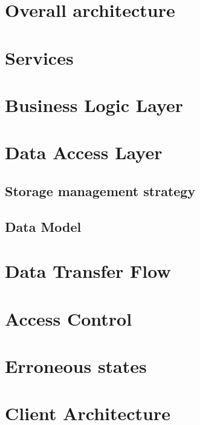 \documentclass{report}
\begin{document}
\section{Overall architecture}


\section{Services}


\section{Business Logic Layer}


\section{Data Access Layer}
\subsection{Storage management strategy}

\subsection{Data Model}




\section{Data Transfer Flow}


% 

\section{Access Control}


\section{Erroneous states}




\section{Client Architecture}

\end{document}
